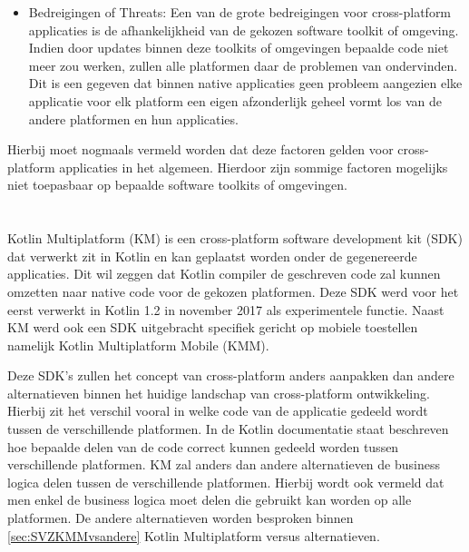 \begin{itemize}
    \item Bedreigingen of Threats:
    Een van de grote bedreigingen voor cross-platform applicaties is de afhankelijkheid van de gekozen software toolkit of omgeving. Indien door updates binnen deze toolkits of omgevingen bepaalde code niet meer zou werken, zullen alle platformen daar de problemen van ondervinden. Dit is een gegeven dat binnen native applicaties geen probleem aangezien elke applicatie voor elk platform een eigen afzonderlijk geheel vormt los van de andere platformen en hun applicaties. 
\end{itemize}

Hierbij moet nogmaals vermeld worden dat deze factoren gelden voor cross-platform applicaties in het algemeen. Hierdoor zijn sommige factoren mogelijks niet toepasbaar op bepaalde software toolkits of omgevingen. 



\section{}
\label{sec:SVZKM}

Kotlin Multiplatform (KM) is een cross-platform software development kit (SDK) dat verwerkt zit in Kotlin en kan geplaatst worden onder de gegenereerde applicaties. Dit wil zeggen dat Kotlin compiler de geschreven code zal kunnen omzetten naar native code voor de gekozen platformen.\autocite{Evert2019} Deze SDK werd voor het eerst verwerkt in Kotlin 1.2 in november 2017 als experimentele functie.\autocite{Jemerov2017} Naast KM werd ook een SDK uitgebracht specifiek gericht op mobiele toestellen namelijk Kotlin Multiplatform Mobile (KMM). 

Deze SDK's zullen het concept van cross-platform anders aanpakken dan andere alternatieven binnen het huidige landschap van cross-platform ontwikkeling. Hierbij zit het verschil vooral in welke code van de applicatie gedeeld wordt tussen de verschillende platformen. In de Kotlin documentatie staat beschreven hoe bepaalde delen van de code correct kunnen gedeeld worden tussen verschillende platformen. KM zal anders dan andere alternatieven de business logica delen tussen de verschillende platformen.\autocite{Kotlin2021} Hierbij wordt ook vermeld dat men enkel de business logica moet delen die gebruikt kan worden op alle platformen. De andere alternatieven worden besproken binnen \ref{sec:SVZKMMvsandere} Kotlin Multiplatform versus alternatieven.

